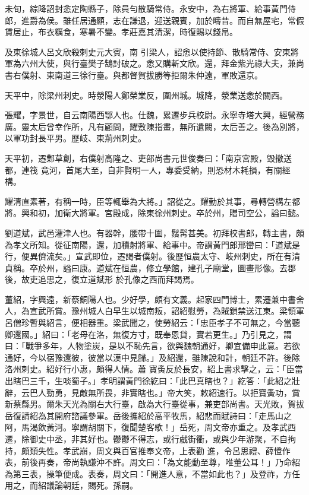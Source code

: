 \begin{pinyinscope}
 未旬，綜降詔封悆定陶縣子，除員勻散騎常侍。永安中，為右將軍、給事黃門侍郎，進爵為侯。雖任居通顯，志在謙退，迎送親賓，加於疇昔。而自無屋宅，常假賃居止，布衣糲食，寒暑不變。孝莊嘉其清潔，時復賜以錢帛。



 及東徐城人呂文欣殺刺史元大賓，南
 引梁人，詔悆以使持節、散騎常侍、安東將軍為六州大使，與行臺樊子鵠討破之。悆又購斬文欣。還，拜金紫光祿大夫，兼尚書右僕射、東南道三徐行臺。與都督賀拔勝等拒爾朱仲遠，軍敗還京。



 天平中，除梁州刺史。時滎陽人鄭榮業反，圍州城。城降，滎業送悆於關西。



 張耀，字景世，自云南陽西鄂人也。仕魏，累遷步兵校尉。永寧寺塔大興，經營務廣。靈太后曾幸作所，凡有顧問，耀敷陳指畫，無所遺闕，太后善之。後為別將，以軍功封長平男。歷岐、東荊州刺史。



 天平初，遷鄴草創，右僕射高隆之、吏部尚書元世俊奏曰：「南京宮殿，毀撤送都，連筏
 竟河，首尾大至，自非賢明一人，專委受納，則恐材木耗損，有關經構。



 耀清直素著，有稱一時，臣等輒舉為大將。」詔從之。耀勤於其事，尋轉營構左都將。興和初，加衛大將軍。宮殿成，除東徐州刺史。卒於州，贈司空公，謚曰懿。



 劉道斌，武邑灌津人也。有器幹，腰帶十圍，鬚髯甚美。初拜校書郎，轉主書，頗為孝文所知。從征南陽，還，加積射將軍、給事中。帝謂黃門郎邢巒曰：「道斌是行，便異儕流矣。」宣武即位，遷謁者僕射。後歷恒農太守、岐州刺史，所在有清貞稱。卒於州，謚曰康。道斌在恒農，修立學館，建孔子廟堂，圖畫形像。去郡後，故吏追思之，復立道斌形
 於孔像之西而拜謁焉。



 董紹，字興遠，新蔡鮦陽人也。少好學，頗有文義。起家四門博士，累遷兼中書舍人，為宣武所賞。豫州城人白早生以城南叛，詔紹慰勞，為賊鎖禁送江東。梁領軍呂僧珍暫與紹言，便相器重。梁武聞之，使勞紹云：「忠臣孝子不可無之，今當聽卿還國。」紹曰：「老母在洛，無復方寸，既奉恩貸，實若更生。」乃引見之，謂曰：「戰爭多年，人物塗炭，是以不恥先言，欲與魏朝通好，卿宜備申此意。若欲通好，今以宿豫還彼，彼當以漢中見歸。」及紹還，雖陳說和計，朝廷不許。後除洛州刺史。紹好行小惠，頗得人情。蕭
 寶夤反於長安，紹上書求擊之，云：「臣當出瞎巴三千，生啖蜀子。」孝明謂黃門徐紇曰：「此巴真瞎也？」紇答：「此紹之壯辭，云巴人勁勇，見敵無所畏，非實瞎也。」帝大笑，敕紹速行。以拒寶夤功，賞新蔡縣男。爾朱天光為關右大行臺，啟為大行臺從事，兼吏部尚書。天光敗，賀拔岳復請紹為其開府諮議參軍。岳後攜紹於高平牧馬，紹悲而賦詩曰：「走馬山之阿，馬渴飲黃河。寧謂胡關下，復聞楚客歌！」岳死，周文帝亦重之。及孝武西遷，除御史中丞，非其好也。鬱鬱不得志，或行戲街衢，或與少年游聚，不自拘持，頗類失性。孝武崩，周文與百官推奉文帝，上表勸
 進，令呂思禮、薛憕作表，前後再奏，帝尚執謙沖不許。周文曰：「為文能動至尊，唯董公耳！」乃命紹為第三表，操筆便成。表奏，周文曰：「開進人意，不當如此也？」及登祚，方任用之，而紹議論朝廷，賜死。孫嗣。




\end{pinyinscope}
